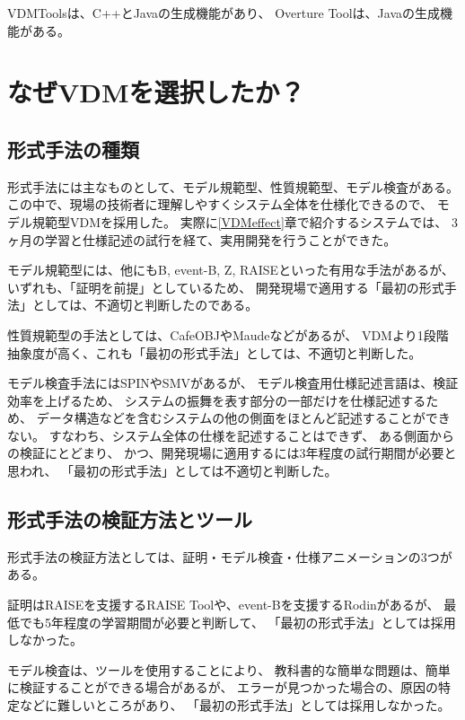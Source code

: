 VDMToolsは、C++とJavaの生成機能があり、
Overture Toolは、Javaの生成機能がある。

\section{なぜVDMを選択したか？}
	\label{WhyVDM}

\subsection{形式手法の種類}

形式手法には主なものとして、モデル規範型、性質規範型、モデル検査がある。
この中で、現場の技術者に理解しやすくシステム全体を仕様化できるので、
モデル規範型VDMを採用した。
実際に\ref{VDMeffect}章で紹介するシステムでは、
3ヶ月の学習と仕様記述の試行を経て、実用開発を行うことができた。

モデル規範型には、他にもB, event-B, Z, RAISEといった有用な手法があるが、
いずれも、「証明を前提」としているため、
開発現場で適用する「最初の形式手法」としては、不適切と判断したのである。

性質規範型の手法としては、CafeOBJやMaudeなどがあるが、
VDMより1段階抽象度が高く、これも「最初の形式手法」としては、不適切と判断した。

モデル検査手法にはSPINやSMVがあるが、
モデル検査用仕様記述言語は、検証効率を上げるため、
システムの振舞を表す部分の一部だけを仕様記述するため、
データ構造などを含むシステムの他の側面をほとんど記述することができない。
すなわち、システム全体の仕様を記述することはできず、
ある側面からの検証にとどまり、
かつ、開発現場に適用するには3年程度の試行期間が必要と思われ、
「最初の形式手法」としては不適切と判断した。

\subsection{形式手法の検証方法とツール}

形式手法の検証方法としては、証明・モデル検査・仕様アニメーションの3つがある。

証明はRAISEを支援するRAISE Toolや、event-Bを支援するRodinがあるが、
最低でも5年程度の学習期間が必要と判断して、
「最初の形式手法」としては採用しなかった。

モデル検査は、ツールを使用することにより、
教科書的な簡単な問題は、簡単に検証することができる場合があるが、
エラーが見つかった場合の、原因の特定などに難しいところがあり、
「最初の形式手法」としては採用しなかった。

